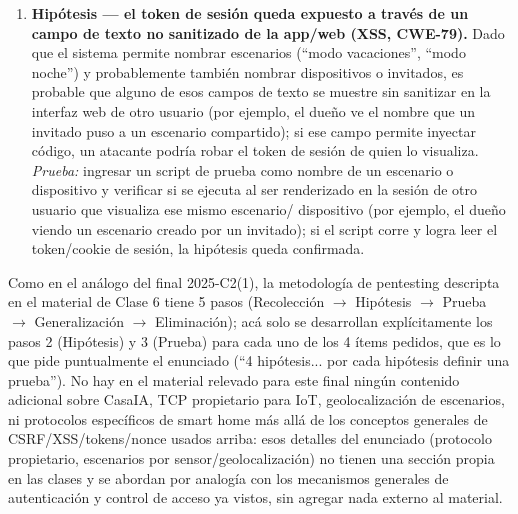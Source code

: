 \begin{enumerate}
  email para el acceso temporal de invitados sea un token que, una vez generado,
  siga siendo válido más allá de la ventana de tiempo configurada, o que no se
  invalide si el dueño revoca el acceso manualmente antes de tiempo (análogo a un
  token/nonce anti-CSRF sin frescura real); cualquiera que intercepte ese mail
  (reenvío, cuenta de correo comprometida, o el link cacheado en el navegador del
  invitado) podría seguir usándolo después de vencida la ventana. \emph{Prueba:}
  generar un acceso temporal con una ventana corta, dejar que venza (o revocarlo
  manualmente desde la app antes de que venza) y volver a abrir el mismo enlace;
  si el sistema sigue otorgando control sobre los dispositivos, la hipótesis queda
  confirmada.
  \item \textbf{Hipótesis --- el token de sesión queda expuesto a través de un
  campo de texto no sanitizado de la app/web (XSS, CWE-79).} Dado que el sistema
  permite nombrar escenarios (``modo vacaciones'', ``modo noche'') y probablemente
  también nombrar dispositivos o invitados, es probable que alguno de esos campos
  de texto se muestre sin sanitizar en la interfaz web de otro usuario (por
  ejemplo, el dueño ve el nombre que un invitado puso a un escenario compartido);
  si ese campo permite inyectar código, un atacante podría robar el token de
  sesión de quien lo visualiza. \emph{Prueba:} ingresar un script de prueba como
  nombre de un escenario o dispositivo y verificar si se ejecuta al ser
  renderizado en la sesión de otro usuario que visualiza ese mismo escenario/
  dispositivo (por ejemplo, el dueño viendo un escenario creado por un invitado);
  si el script corre y logra leer el token/cookie de sesión, la hipótesis queda
  confirmada.
\end{enumerate}

\begin{ojo}
Como en el análogo del final 2025-C2(1), la metodología de pentesting descripta
en el material de Clase 6 tiene 5 pasos (Recolección $\to$ Hipótesis $\to$ Prueba
$\to$ Generalización $\to$ Eliminación); acá solo se desarrollan explícitamente los
pasos 2 (Hipótesis) y 3 (Prueba) para cada uno de los 4 ítems pedidos, que es lo
que pide puntualmente el enunciado (``4 hipótesis... por cada hipótesis definir
una prueba''). No hay en el material relevado para este final ningún contenido
adicional sobre CasaIA, TCP propietario para IoT, geolocalización de escenarios,
ni protocolos específicos de smart home más allá de los conceptos generales de
CSRF/XSS/tokens/nonce usados arriba: esos detalles del enunciado (protocolo
propietario, escenarios por sensor/geolocalización) no tienen una sección propia
en las clases y se abordan por analogía con los mecanismos generales de
autenticación y control de acceso ya vistos, sin agregar nada externo al material.
\end{ojo}
